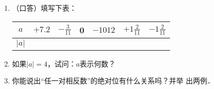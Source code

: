 \begin{ex}
\begin{enumerate}
    \item （口答）填写下表：
    \begin{center}
\begin{tabular}{c|cccccc}
    \hline
$a$ & $+7.2$ & $-\frac{3}{11}$ & 0& $-1012$ &$+1\frac{2}{11}$ &$-1\frac{2}{11}$\\
   \hline
$|a|$\\
    \hline
\end{tabular}       
    \end{center}
\item 如果$|a|=4$，试问：$a$表示何数？
\item 你能说出“任一对相反数”的绝对位有什么关系吗？并举
  出两例．
\end{enumerate}
\end{ex}

